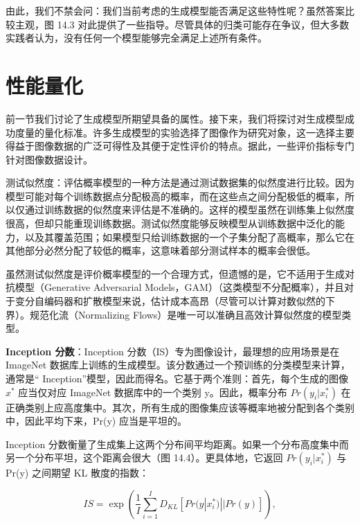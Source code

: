 \documentclass[lang=cn,newtx,10pt,scheme=chinese]{elegantbook}
\begin{document}
由此，我们不禁会问：我们当前考虑的生成模型能否满足这些特性呢？虽然答案比较主观，图 14.3 对此提供了一些指导。尽管具体的归类可能存在争议，但大多数实践者认为，没有任何一个模型能够完全满足上述所有条件。


\section{性能量化}
前一节我们讨论了生成模型所期望具备的属性。接下来，我们将探讨对生成模型成功度量的量化标准。许多生成模型的实验选择了图像作为研究对象，这一选择主要得益于图像数据的广泛可得性及其便于定性评价的特点。据此，一些评价指标专门针对图像数据设计。

测试似然度：评估概率模型的一种方法是通过测试数据集的似然度进行比较。因为模型可能对每个训练数据点分配极高的概率，而在这些点之间分配极低的概率，所以仅通过训练数据的似然度来评估是不准确的。这样的模型虽然在训练集上似然度很高，但却只能重现训练数据。测试似然度能够反映模型从训练数据中泛化的能力，以及其覆盖范围；如果模型只给训练数据的一个子集分配了高概率，那么它在其他部分必然分配了较低的概率，这意味着部分测试样本的概率会很低。

虽然测试似然度是评价概率模型的一个合理方式，但遗憾的是，它不适用于生成对抗模型（Generative Adversarial Models，GAM）（这类模型不分配概率），并且对于变分自编码器和扩散模型来说，估计成本高昂（尽管可以计算对数似然的下界）。规范化流（Normalizing Flows）是唯一可以准确且高效计算似然度的模型类型。

\textbf{Inception 分数}：Inception 分数（IS）专为图像设计，最理想的应用场景是在 ImageNet 数据库上训练的生成模型。该分数通过一个预训练的分类模型来计算，通常是“ Inception”模型，因此而得名。它基于两个准则：首先，每个生成的图像 \(x^*\) 应当仅对应 ImageNet 数据库中的一个类别 y。因此，概率分布 \(Pr(y_i|x^*_i)\) 在正确类别上应高度集中。其次，所有生成的图像集应该等概率地被分配到各个类别中，因此平均下来，Pr(y) 应当是平坦的。

Inception 分数衡量了生成集上这两个分布间平均距离。如果一个分布高度集中而另一个分布平坦，这个距离会很大（图 14.4）。更具体地，它返回 \(Pr(y_i|x^*_i)\) 与 Pr(y) 之间期望 KL 散度的指数：

\begin{equation}
IS = \exp \left( \frac{1}{I} \sum_{i=1}^{I} D_{KL} [ Pr(y|x_i^*) || Pr(y) ] \right),
\end{equation}
\end{document}
